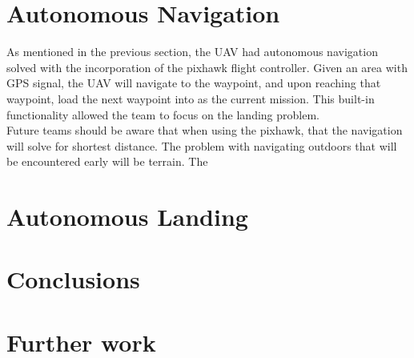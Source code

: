 \section{Autonomous Navigation}
As mentioned in the previous section, the UAV had autonomous navigation solved with the incorporation of the pixhawk flight controller. Given an area with GPS signal, the UAV will navigate to the waypoint, and upon reaching that waypoint, load the next waypoint into as the current mission. This built-in functionality allowed the team to focus on the landing problem.\\

Future teams should be aware that when using the pixhawk, that the navigation will solve for shortest distance. The problem with navigating outdoors that will be encountered early will be terrain. The 

\section{Autonomous Landing}

\section{Conclusions}

\section{Further work}  
